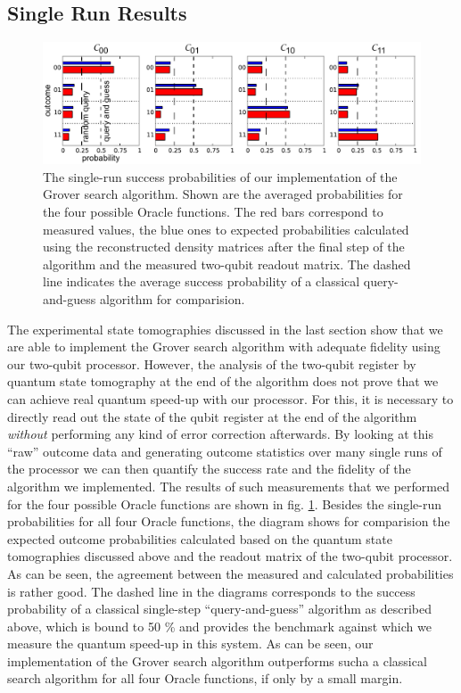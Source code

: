 \subsection{Single Run Results}

\begin{figure}[ht!]
	\centering
		\includegraphics[width=1.\textwidth]{"./data/ct5/2011_04_21 - grover and tomo/good_data/grover algorithm - single run probabilities"}
		\caption[Single-run success probabilities of the Grover search algorithm]{The single-run success probabilities of our implementation of the Grover search algorithm. Shown are the averaged probabilities for the four possible Oracle functions. The red bars correspond to measured values, the blue ones to expected probabilities calculated using the reconstructed density matrices after the final step of the algorithm and the measured two-qubit readout matrix. The dashed line indicates the average success probability of a classical query-and-guess algorithm for comparision.}
	\label{fig:GroverSingleShotResults}
\end{figure}
The experimental state tomographies discussed in the last section show that we are able to implement the Grover search algorithm with adequate fidelity using our two-qubit processor. However, the analysis of the two-qubit register by quantum state tomography at the end of the algorithm does not prove that we can achieve real quantum speed-up with our processor. For this, it is necessary to directly read out the state of the qubit register at the end of the algorithm {\it without} performing any kind of error correction afterwards. By looking at this ``raw'' outcome data and generating outcome statistics over many single runs of the processor we can then quantify the success rate and the fidelity of the algorithm we implemented. The results of such measurements that we performed for the four possible Oracle functions are shown in fig. \ref{fig:GroverSingleShotResults}. Besides the single-run probabilities for all four Oracle functions, the diagram shows for comparision the expected outcome probabilities calculated based on the quantum state tomographies discussed above and the readout matrix of the two-qubit processor. As can be seen, the agreement between the measured and calculated probabilities is rather good. The dashed line in the diagrams corresponds to the success probability of a classical single-step ``query-and-guess'' algorithm as described above, which is bound to 50 \% and provides the benchmark against which we measure the quantum speed-up in this system. As can be seen, our implementation of the Grover search algorithm outperforms sucha a classical search algorithm for all four Oracle functions, if only by a small margin.


